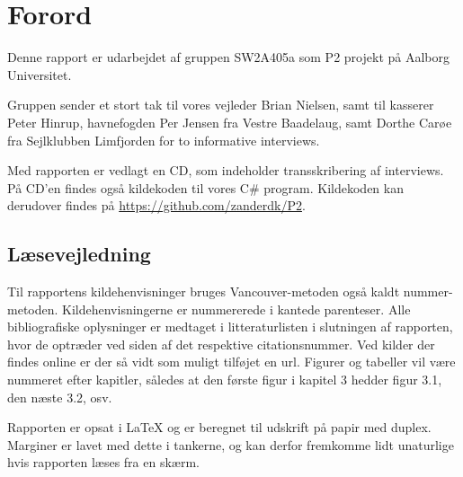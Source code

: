 \chapter*{Forord}
Denne rapport er udarbejdet af gruppen SW2A405a som P2 projekt på Aalborg Universitet.

Gruppen sender et stort tak til vores vejleder Brian Nielsen, samt til kasserer Peter Hinrup, havnefogden Per Jensen fra Vestre Baadelaug, samt Dorthe Carøe fra Sejlklubben Limfjorden for to informative interviews.

Med rapporten er vedlagt en CD, som indeholder transskribering af interviews. På CD'en findes også kildekoden til vores C\# program. Kildekoden kan derudover findes på \url{https://github.com/zanderdk/P2}.

\section{Læsevejledning}
Til rapportens kildehenvisninger bruges Vancouver-metoden også kaldt nummer-metoden. Kildehenvisningerne er nummererede i kantede parenteser. Alle bibliografiske oplysninger er medtaget i litteraturlisten i slutningen af rapporten, hvor de optræder ved siden af det respektive citationsnummer. Ved kilder der findes online er der så vidt som muligt tilføjet en url. Figurer og tabeller vil være nummeret efter kapitler, således at den første figur i kapitel 3 hedder figur 3.1, den næste 3.2, osv.	

Rapporten er opsat i \LaTeX{} og er beregnet til udskrift på papir med duplex. Marginer er lavet med dette i tankerne, og kan derfor fremkomme lidt unaturlige hvis rapporten læses fra en skærm.